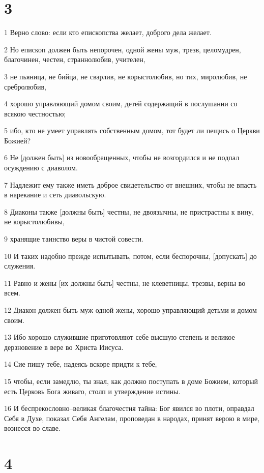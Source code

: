 \chapter{3}

\par 1 Верно слово: если кто епископства желает, доброго дела желает.
\par 2 Но епископ должен быть непорочен, одной жены муж, трезв, целомудрен, благочинен, честен, страннолюбив, учителен,
\par 3 не пьяница, не бийца, не сварлив, не корыстолюбив, но тих, миролюбив, не сребролюбив,
\par 4 хорошо управляющий домом своим, детей содержащий в послушании со всякою честностью;
\par 5 ибо, кто не умеет управлять собственным домом, тот будет ли пещись о Церкви Божией?
\par 6 Не [должен быть] из новообращенных, чтобы не возгордился и не подпал осуждению с диаволом.
\par 7 Надлежит ему также иметь доброе свидетельство от внешних, чтобы не впасть в нарекание и сеть диавольскую.
\par 8 Диаконы также [должны быть] честны, не двоязычны, не пристрастны к вину, не корыстолюбивы,
\par 9 хранящие таинство веры в чистой совести.
\par 10 И таких надобно прежде испытывать, потом, если беспорочны, [допускать] до служения.
\par 11 Равно и жены [их должны быть] честны, не клеветницы, трезвы, верны во всем.
\par 12 Диакон должен быть муж одной жены, хорошо управляющий детьми и домом своим.
\par 13 Ибо хорошо служившие приготовляют себе высшую степень и великое дерзновение в вере во Христа Иисуса.
\par 14 Сие пишу тебе, надеясь вскоре придти к тебе,
\par 15 чтобы, если замедлю, ты знал, как должно поступать в доме Божием, который есть Церковь Бога живаго, столп и утверждение истины.
\par 16 И беспрекословно--великая благочестия тайна: Бог явился во плоти, оправдал Себя в Духе, показал Себя Ангелам, проповедан в народах, принят верою в мире, вознесся во славе.

\chapter{4}

